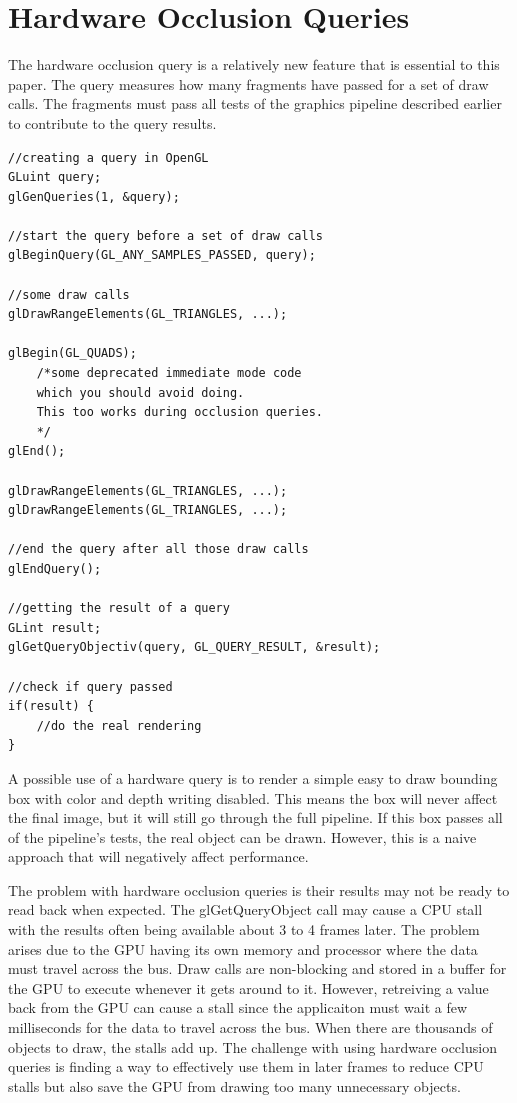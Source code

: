 \documentclass[12pt]{ucthesis}
\begin{document}
\section{Hardware Occlusion Queries}
\label{hardware-occlusion-queries}

The hardware occlusion query is a relatively new feature that is essential to this paper.
The query measures how many fragments have passed for a set of draw calls.
The fragments must pass all tests of the graphics pipeline described earlier to contribute to the query results.

\begin{lstlisting}
//creating a query in OpenGL
GLuint query;
glGenQueries(1, &query);

//start the query before a set of draw calls
glBeginQuery(GL_ANY_SAMPLES_PASSED, query);

//some draw calls
glDrawRangeElements(GL_TRIANGLES, ...);

glBegin(GL_QUADS);
    /*some deprecated immediate mode code 
    which you should avoid doing.
    This too works during occlusion queries.
    */
glEnd();

glDrawRangeElements(GL_TRIANGLES, ...);
glDrawRangeElements(GL_TRIANGLES, ...);

//end the query after all those draw calls
glEndQuery();

//getting the result of a query
GLint result;
glGetQueryObjectiv(query, GL_QUERY_RESULT, &result);

//check if query passed
if(result) {
    //do the real rendering
}
\end{lstlisting}

A possible use of a hardware query is to render a simple easy to draw bounding box with color and depth writing disabled.
This means the box will never affect the final image, but it will still go through the full pipeline.
If this box passes all of the pipeline's tests, the real object can be drawn.
However, this is a naive approach that will negatively affect performance.

The problem with hardware occlusion queries is their results may not be ready to read back when expected.\cite{GpuGem-Occlusion, GpuGem-Queries, CHC, CHCpp}
The glGetQueryObject call may cause a CPU stall with the results often being available about 3 to 4 frames later.
The problem arises due to the GPU having its own memory and processor where the data must travel across the bus.
Draw calls are non-blocking and stored in a buffer for the GPU to execute whenever it gets around to it.
However, retreiving a value back from the GPU can cause a stall since the applicaiton must wait a few milliseconds for the data to travel across the bus.
When there are thousands of objects to draw, the stalls add up.
The challenge with using hardware occlusion queries is finding a way to effectively use them in later frames to reduce CPU stalls but also save the GPU from drawing too many unnecessary objects.
\end{document}
